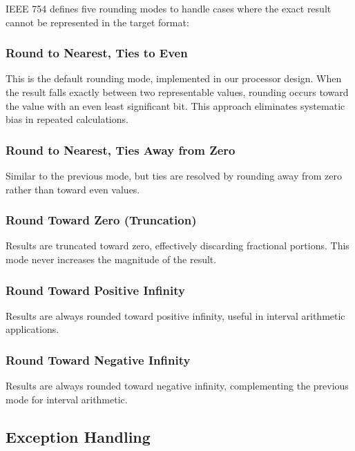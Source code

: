 IEEE 754 defines five rounding modes to handle cases where the exact result cannot be represented in the target format:

\subsubsection{Round to Nearest, Ties to Even}
\label{subsubsec:round_nearest_even}

This is the default rounding mode, implemented in our processor design. When the result falls exactly between two representable values, rounding occurs toward the value with an even least significant bit. This approach eliminates systematic bias in repeated calculations.

\subsubsection{Round to Nearest, Ties Away from Zero}
\label{subsubsec:round_away_zero}

Similar to the previous mode, but ties are resolved by rounding away from zero rather than toward even values.

\subsubsection{Round Toward Zero (Truncation)}
\label{subsubsec:round_toward_zero}

Results are truncated toward zero, effectively discarding fractional portions. This mode never increases the magnitude of the result.

\subsubsection{Round Toward Positive Infinity}
\label{subsubsec:round_positive_infinity}

Results are always rounded toward positive infinity, useful in interval arithmetic applications.

\subsubsection{Round Toward Negative Infinity}
\label{subsubsec:round_negative_infinity}

Results are always rounded toward negative infinity, complementing the previous mode for interval arithmetic.

\subsection{Exception Handling}
\label{subsec:ieee754_exceptions}

